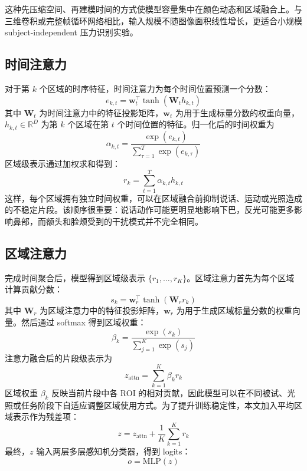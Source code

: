 \documentclass[runningheads]{llncs}
\begin{document}
这种先压缩空间、再建模时间的方式使模型容量集中在颜色动态和区域融合上。与三维卷积或完整帧循环网络相比，输入规模不随图像面积线性增长，更适合小规模 subject-independent 压力识别实验。

\subsection{时间注意力}

对于第 $k$ 个区域的时序特征，时间注意力为每个时间位置预测一个分数：
\begin{equation}
    e_{k,t} = \mathbf{w}_t^\top \tanh(\mathbf{W}_t h_{k,t})
\end{equation}
其中 $\mathbf{W}_t$ 为时间注意力中的特征投影矩阵，$\mathbf{w}_t$ 为用于生成标量分数的权重向量，$h_{k,t} \in \mathbb{R}^{D}$ 为第 $k$ 个区域在第 $t$ 个时间位置的特征。归一化后的时间权重为
\begin{equation}
    \alpha_{k,t} = \frac{\exp(e_{k,t})}{\sum_{\tau=1}^{T}\exp(e_{k,\tau})}
\end{equation}
区域级表示通过加权求和得到：
\begin{equation}
    r_k = \sum_{t=1}^{T}\alpha_{k,t} h_{k,t}
\end{equation}
这样，每个区域拥有独立时间权重，可以在区域融合前抑制说话、运动或光照造成的不稳定片段。该顺序很重要：说话动作可能更明显地影响下巴，反光可能更多影响鼻部，而额头和脸颊受到的干扰模式并不完全相同。

\subsection{区域注意力}

完成时间聚合后，模型得到区域级表示 $\{r_1,\ldots,r_K\}$。区域注意力首先为每个区域计算贡献分数：
\begin{equation}
    s_k = \mathbf{w}_r^\top \tanh(\mathbf{W}_r r_k)
\end{equation}
其中 $\mathbf{W}_r$ 为区域注意力中的特征投影矩阵，$\mathbf{w}_r$ 为用于生成区域标量分数的权重向量。然后通过 softmax 得到区域权重：
\begin{equation}
    \beta_k = \frac{\exp(s_k)}{\sum_{j=1}^{K}\exp(s_j)}
\end{equation}
注意力融合后的片段级表示为
\begin{equation}
    z_{\mathrm{attn}} = \sum_{k=1}^{K}\beta_k r_k
\end{equation}
区域权重 $\beta_k$ 反映当前片段中各 ROI 的相对贡献，因此模型可以在不同被试、光照或任务阶段下自适应调整区域使用方式。为了提升训练稳定性，本文加入平均区域表示作为残差项：
\begin{equation}
    z = z_{\mathrm{attn}} + \frac{1}{K}\sum_{k=1}^{K} r_k
\end{equation}
最终，$z$ 输入两层多层感知机分类器，得到 logits：
\begin{equation}
    o = \mathrm{MLP}(z)
\end{equation}
\end{document}
